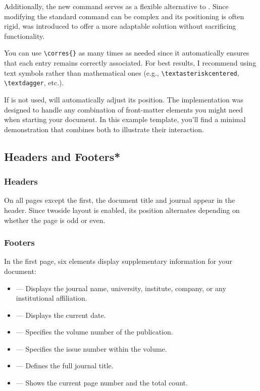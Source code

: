 \documentclass[9pt,a4paper,twocolumn,twoside]{rho-class/rho}
\begin{document}
        Additionally, the new \inlinecode{\corres{}} command serves as a flexible alternative to \inlinecode{\thanks{}}. Since modifying the standard \inlinecode{\thanks{}} command can be complex and its positioning is often rigid, \inlinecode{\corres{}} was introduced to offer a more adaptable solution without sacrificing functionality. 
        
        \begin{note}
            You can use \verb|\corres{}| as many times as needed since it automatically ensures that each entry remains correctly associated. For best results, I recommend using text symbols rather than mathematical ones (e.g., \verb|\textasteriskcentered|, \verb|\textdagger|, etc.). 
        \end{note}

        If \inlinecode{\corres{}} is not used, \inlinecode{\docinfo{}} will automatically adjust its position. The implementation was designed to handle any combination of front-matter elements you might need when starting your document. In this example template, you’ll find a minimal demonstration that combines both to illustrate their interaction.

    \subsection{Headers and Footers*}

        \subsubsection{Headers}

            On all pages except the first, the document title and journal appear in the header. Since twoside layout is enabled, its position alternates depending on whether the page is odd or even.

        \subsubsection{Footers}

            In the first page, six elements display supplementary information for your document:

            \begin{itemize}
                \item \inlinecode{\journalname{}} — Displays the journal name, university, institute, company, or any institutional affiliation.
                \item \inlinecode{\theday{}} — Displays the current date.
                \item \inlinecode{\vol{}} — Specifies the volume number of the publication.
                \item \inlinecode{\no{}} — Specifies the issue number within the volume.
                \item \inlinecode{\journal{}} — Defines the full journal title.
                \item \inlinecode{\thepage} — Shows the current page number and the total count.
            \end{itemize}
\end{document}
